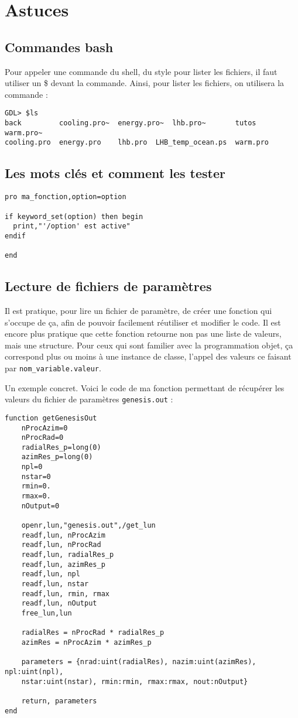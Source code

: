 \documentclass[a4paper,twoside]{article}
\begin{document}
\section{Astuces}
\subsection{Commandes bash}
Pour appeler une commande du shell, du style pour lister les fichiers, il faut utiliser un \$ devant la commande. Ainsi, pour lister les fichiers, on utilisera la commande :
\begin{verbatim}
GDL> $ls
back	     cooling.pro~  energy.pro~	lhb.pro~	   tutos     warm.pro~
cooling.pro  energy.pro    lhb.pro	LHB_temp_ocean.ps  warm.pro
\end{verbatim}

\subsection{Les mots clés et comment les tester}
\begin{lstlisting}[language=IDL]
pro ma_fonction,option=option

if keyword_set(option) then begin
  print,"'/option' est active"
endif

end
\end{lstlisting}

\subsection{Lecture de fichiers de paramètres}
Il est pratique, pour lire un fichier de paramètre, de créer une fonction qui s'occupe de ça, afin de pouvoir facilement réutiliser et modifier le code. Il est encore plus pratique que cette fonction retourne non pas une liste de valeurs, mais une structure. Pour ceux qui sont familier avec la programmation objet, ça correspond plus ou moins à une instance de classe, l'appel des valeurs ce faisant par \texttt{nom\_variable.valeur}.

Un exemple concret. Voici le code de ma fonction permettant de récupérer les valeurs du fichier de paramètres \texttt{genesis.out} :
\begin{lstlisting}[language=IDL]
function getGenesisOut
	nProcAzim=0
	nProcRad=0
	radialRes_p=long(0)
	azimRes_p=long(0)
	npl=0
	nstar=0
	rmin=0.
	rmax=0.
	nOutput=0

	openr,lun,"genesis.out",/get_lun
	readf,lun, nProcAzim
	readf,lun, nProcRad
	readf,lun, radialRes_p
	readf,lun, azimRes_p
	readf,lun, npl
	readf,lun, nstar
	readf,lun, rmin, rmax
	readf,lun, nOutput
	free_lun,lun

	radialRes = nProcRad * radialRes_p
	azimRes = nProcAzim * azimRes_p

	parameters = {nrad:uint(radialRes), nazim:uint(azimRes), npl:uint(npl),
	nstar:uint(nstar), rmin:rmin, rmax:rmax, nout:nOutput}

	return, parameters
end
\end{lstlisting}
\end{document}
